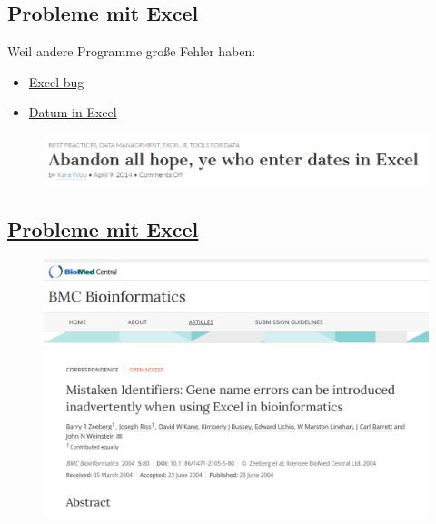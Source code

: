 \documentclass[]{article}
\begin{document}
\subsection{Probleme mit Excel}\label{probleme-mit-excel}

Weil andere Programme große Fehler haben:

\begin{itemize}
\item
  \href{http://blog.revolutionanalytics.com/2013/02/did-an-excel-error-bring-down-the-london-whale.html}{Excel
  bug}
\item
  \href{https://coffeehouse.dataone.org/2014/04/09/abandon-all-hope-ye-who-enter-dates-in-excel/}{Datum
  in Excel}
\end{itemize}

\begin{figure}[htbp]
\centering
\includegraphics{figure/Abandon.PNG}
\caption{}
\end{figure}

\subsection{\texorpdfstring{\href{http://www.biomedcentral.com/1471-2105/5/80}{Probleme
mit Excel}}{Probleme mit Excel}}\label{probleme-mit-excel-1}

\begin{figure}[htbp]
\centering
\includegraphics{figure/ExcelProblems.PNG}
\caption{}
\end{figure}
\end{document}
